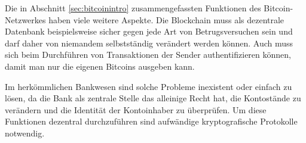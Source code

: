 Die in Abschnitt \ref{sec:bitcoinintro} zusammengefassten Funktionen des Bitcoin-Netzwerkes haben viele weitere Aspekte.
Die Blockchain muss als dezentrale Datenbank beispielsweise sicher gegen jede Art von Betrugsversuchen sein und darf daher von niemandem selbstständig verändert werden können.
Auch muss sich beim Durchführen von Transaktionen der Sender authentifizieren können, damit man nur die eigenen Bitcoins ausgeben kann.

Im herkömmlichen Bankwesen sind solche Probleme inexistent oder einfach zu lösen, da die Bank als zentrale Stelle das alleinige Recht hat, die Kontostände zu verändern und die Identität der Kontoinhaber zu überprüfen.
Um diese Funktionen dezentral durchzuführen sind aufwändige kryptografische Protokolle notwendig.
